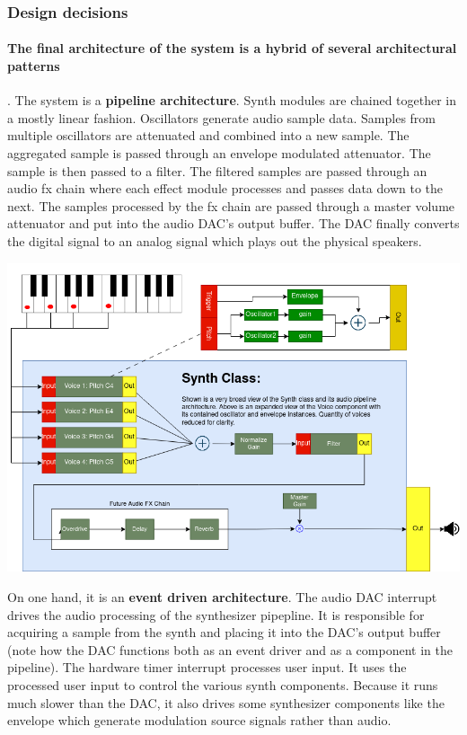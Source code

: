 \documentclass[acmlarge,screen]{acmart}
\begin{document}
	\subsubsection{Design decisions}
	\paragraph{The final architecture of the system is a hybrid of several architectural patterns}. The system is a \textbf{pipeline architecture}. Synth modules are chained together in a mostly linear fashion. Oscillators generate audio sample data. Samples from multiple oscillators are attenuated and combined into a new sample. The aggregated sample is passed through an envelope modulated attenuator. The sample is then passed to a filter. The filtered samples are passed through an audio fx chain where each effect module processes and passes data down to the next. The samples processed by the fx chain are passed through a master volume attenuator and put into the audio DAC's output buffer. The DAC finally converts the digital signal to an analog signal which plays out the physical speakers.
	
	\includegraphics[width=\linewidth]{Synth_Audio_Pipeline}
	
	On one hand, it is an \textbf{event driven architecture}. The audio DAC interrupt drives the audio processing of the synthesizer pipepline. It is responsible for acquiring a sample from the synth and placing it into the DAC's output buffer (note how the DAC functions both as an event driver and as a component in the pipeline). The hardware timer interrupt processes user input. It uses the processed user input to control the various synth components. Because it runs much slower than the DAC, it also drives some synthesizer components like the envelope which generate modulation source signals rather than audio.
	
\end{document}
